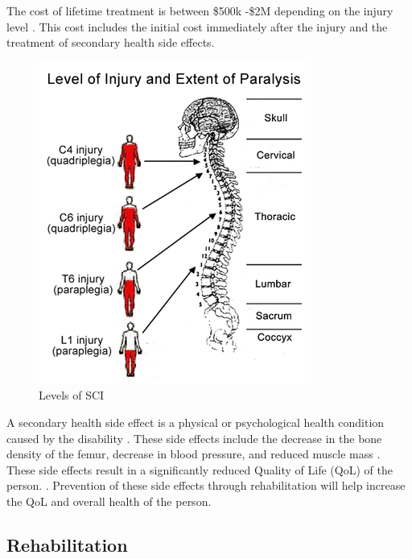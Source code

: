 The cost of lifetime treatment is between \$500k -\$2M depending on the injury level \cite{mcdonald2002spinal}. This cost includes the initial cost immediately after the injury and the treatment of secondary health side effects.  

 

\begin{figure}
    \centering
    \includegraphics[scale=0.6]{images/background/SCI.png}
    \caption[Levels of SCI]{Levels of SCI \cite{sadaka2012bradycardia}}
    \label{fig:SCILevels}
\end{figure}

A secondary health side effect is a physical or psychological health condition caused by the disability \cite{jensen2012secondary}.  These side effects include the decrease in the bone density of the femur, decrease in blood pressure, and reduced muscle mass \cite{haisma2007complications} \cite{hitzig2010understanding}. These side effects result in a significantly reduced Quality of Life (QoL) of the person.  	\cite{craven2012impact}. Prevention of these side effects through rehabilitation will help increase the QoL and overall health of the person.  








\subsection{Rehabilitation}
\label{sec:rehab}

